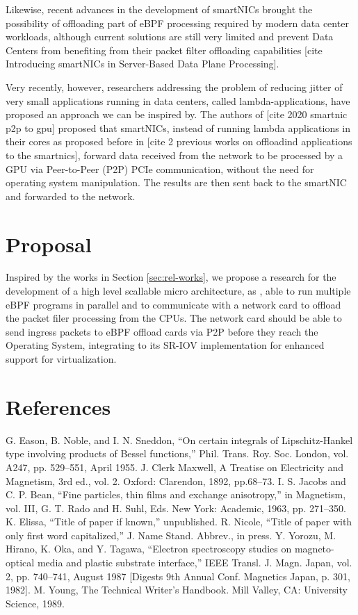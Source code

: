 \documentclass[conference]{IEEEtran}
\begin{document}
Likewise, recent advances in the development of smartNICs brought the possibility of offloading part of eBPF processing required by modern data center workloads, although current solutions are still very limited and prevent Data Centers from benefiting from their packet filter offloading capabilities [cite Introducing smartNICs in Server-Based Data Plane Processing].

Very recently, however, researchers addressing the problem of reducing jitter of very small applications running in data centers, called lambda-applications, have proposed an approach we can be inspired by. The authors of [cite 2020 smartnic p2p to gpu] proposed that smartNICs, instead of running lambda applications in their cores as proposed before in [cite 2 previous works on offloadind applications to the smartnics], forward data received from the network to be processed by a GPU via Peer-to-Peer (P2P) PCIe communication, without the need for operating system manipulation. The results are then sent back to the smartNIC and forwarded to the network.

\section{Proposal}
Inspired by the works in Section \ref{sec:rel-works}, we propose a research for the development of a high level scallable micro architecture, as \cite{ankit2019puma}, able to run multiple eBPF programs in parallel and to communicate with a network card to offload the packet filer processing from the CPUs. The network card should be able to send ingress packets to eBPF offload cards via P2P before they reach the Operating System, integrating to its SR-IOV implementation for enhanced support for virtualization.

\section*{References}

\begin{thebibliography}{00}
 G. Eason, B. Noble, and I. N. Sneddon, ``On certain integrals of Lipschitz-Hankel type involving products of Bessel functions,'' Phil. Trans. Roy. Soc. London, vol. A247, pp. 529--551, April 1955.
 J. Clerk Maxwell, A Treatise on Electricity and Magnetism, 3rd ed., vol. 2. Oxford: Clarendon, 1892, pp.68--73.
 I. S. Jacobs and C. P. Bean, ``Fine particles, thin films and exchange anisotropy,'' in Magnetism, vol. III, G. T. Rado and H. Suhl, Eds. New York: Academic, 1963, pp. 271--350.
 K. Elissa, ``Title of paper if known,'' unpublished.
 R. Nicole, ``Title of paper with only first word capitalized,'' J. Name Stand. Abbrev., in press.
 Y. Yorozu, M. Hirano, K. Oka, and Y. Tagawa, ``Electron spectroscopy studies on magneto-optical media and plastic substrate interface,'' IEEE Transl. J. Magn. Japan, vol. 2, pp. 740--741, August 1987 [Digests 9th Annual Conf. Magnetics Japan, p. 301, 1982].
 M. Young, The Technical Writer's Handbook. Mill Valley, CA: University Science, 1989.
\end{thebibliography}
\vspace{12pt}
\end{document}
